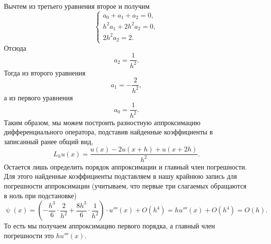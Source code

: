 \documentclass[a4paper, 12pt]{article}
\renewcommand{\psi}{\uppsi}
\begin{document}
\begin{enumerate}
		Вычтем из третьего уравнения второе и получим 
		$$\begin{cases}
			a_0 + a_1 + a_2 = 0,\\
			h^2 a_1+ 2 h^2 a_2= 0,\\
			2h^2a_2 = 2.
		\end{cases}$$
		Отсюда $$a_2 = \dfrac{1}{h^2}.$$
		Тогда из второго уравнения $$a_1 = -\dfrac{2}{h^2},$$ а из первого уравнения $$a_0 = \dfrac{1}{h^2}.$$
		Таким образом, мы можем построить разностную аппроксимацию дифференциального оператора, подставив найденные коэффициенты в записанный ранее общий вид,
		$$L_h u(x) = \dfrac{u(x)  -2 u(x+h) +  u(x+2h)}{h^2}.$$ 
		Остается лишь определить порядок аппроксимации и главный член погрешности. Для этого найденные коэффициенты подставляем в нашу крайнюю запись для погрешности аппроксимации (учитываем, что первые три слагаемых обращаются в ноль при подстановке)
		$$
		\psi(x) = \left(-\dfrac{h^3}{6}\cdot \dfrac{2}{h^2} +\dfrac{8h^3}{6} \cdot \dfrac{1}{h^2}\right)\cdot u'''(x) +O(h^4) = h u'''(x) + O(h^4) = O(h).
		$$
		То есть мы получаем аппроксимацию первого порядка, а главный член погрешности это $hu'''(x)$.
		

\end{enumerate}
\end{document}
